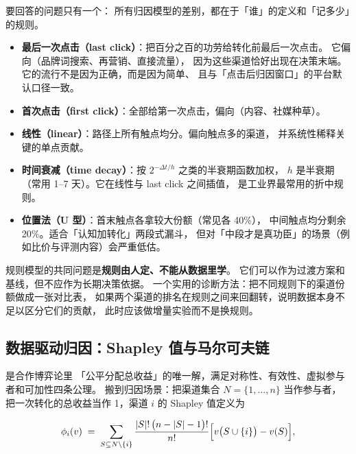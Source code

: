  要回答的问题只有一个：
所有归因模型的差别，都在于「谁」的定义和「记多少」的规则。

\begin{itemize}
  \item \textbf{最后一次点击（last click）}：把百分之百的功劳给转化前最后一次点击。
        它偏向（品牌词搜索、再营销、直接流量），
        因为这些渠道恰好出现在决策末端。它的流行不是因为正确，而是因为简单、
        且与「点击后归因窗口」的平台默认口径一致。
  \item \textbf{首次点击（first click）}：全部给第一次点击，偏向（内容、社媒种草）。
  \item \textbf{线性（linear）}：路径上所有触点均分。偏向触点多的渠道，
        并系统性稀释关键的单点贡献。
  \item \textbf{时间衰减（time decay）}：按 $2^{-\Delta t / h}$ 之类的半衰期函数加权，
        $h$ 是半衰期（常用 1--7 天）。它在线性与 last click 之间插值，
        是工业界最常用的折中规则。
  \item \textbf{位置法（U 型）}：首末触点各拿较大份额（常见各 40\%），
        中间触点均分剩余 20\%。适合「认知加转化」两段式漏斗，
        但对「中段才是真功臣」的场景（例如比价与评测内容）会严重低估。
\end{itemize}

规则模型的共同问题是\textbf{规则由人定、不能从数据里学}。
它们可以作为过渡方案和基线，但不应作为长期决策依据。
一个实用的诊断方法：把不同规则下的渠道份额做成一张对比表，
如果两个渠道的排名在规则之间来回翻转，说明数据本身不足以区分它们的贡献，
此时应该做增量实验而不是换规则。

\subsection{数据驱动归因：Shapley 值与马尔可夫链}

 \cite{shapley1953value} 是合作博弈论里
「公平分配总收益」的唯一解，满足对称性、有效性、虚拟参与者和可加性四条公理。
搬到归因场景：把渠道集合 $N = \{1, \ldots, n\}$ 当作参与者，
把一次转化的总收益当作 1，渠道 $i$ 的 Shapley 值定义为

\begin{equation}
\phi_i(v) \;=\; \sum_{S \subseteq N \setminus \{i\}}
\frac{\left\lvert S \right\rvert!\,\big(n - \left\lvert S \right\rvert - 1\big)!}{n!}
\Big[ v\big(S \cup \{i\}\big) - v(S) \Big],
\label{eq:shapley}
\end{equation}

